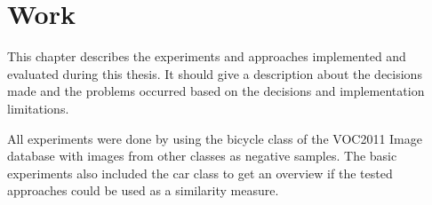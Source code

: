 \chapter{Work}
\label{cha:work}

This chapter describes the experiments and approaches implemented and evaluated during this thesis. It should give a description about the decisions made and the problems occurred based on the decisions and implementation limitations.

All experiments were done by using the bicycle class of the \ac{VOC2011} Image database \cite{Pascal2011} with images from other classes as negative samples. The basic experiments also included the car class to get an overview if the tested approaches could be used as a similarity measure.













